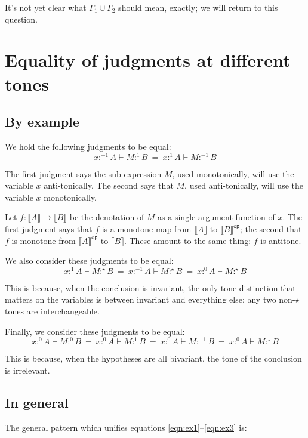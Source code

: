 \documentclass{article}
\newcommand{\todo}[1]{{\color{red}#1}}
\newcommand{\ms}[1]{\ensuremath{\mathsf{#1}}}
\newcommand{\GG}{\Gamma}
\newcommand{\op}{\ms{op}}
\newcommand{\den}[1]{\llbracket{#1}\rrbracket}
\newcommand{\tm}{\ensuremath{1}}     %
\newcommand{\ta}{\ensuremath{{-1}}}  %
\newcommand{\ti}{\ensuremath{\star}} %
\newcommand{\tb}{\ensuremath{0}}     %
\newcommand{\h}[3]{#1 :^{#3}\! {#2}}
\newcommand{\hm}[2]{\h{#1}{#2}{\tm}}
\newcommand{\ha}[2]{\h{#1}{#2}{\ta}}
\newcommand{\hi}[2]{\h{#1}{#2}{\ti}}
\newcommand{\hb}[2]{\h{#1}{#2}{\tb}}
\begin{document}
It's not yet clear what $\GG_1 \cup \GG_2$ should mean, exactly; \todo{we will
  return to this question.}


\section{Equality of judgments at different tones}

\subsection{By example}

We hold the following judgments to be equal:
\begin{equation}\label{eqn:ex1}
 \ha{x}{A} \vdash \hm{M}{B} ~=~ \hm{x}{A} \vdash \ha{M}{B}
\end{equation}

The first judgment says the sub-expression $M$, used monotonically, will use the
variable $x$ anti-tonically. The second says that $M$, used anti-tonically, will
use the variable $x$ monotonically.

Let $f : \den{A} \to \den{B}$ be the denotation of $M$ as a single-argument
function of $x$. The first judgment says that $f$ is a monotone map from
$\den{A}$ to $\den{B}^{\op}$; the second that $f$ is monotone from
$\den{A}^{\op}$ to $\den{B}$. These amount to the same thing: $f$ is
antitone.

We also consider these judgments to be equal:
\begin{equation}
  \hm{x}{A} \vdash \hi{M}{B}
  ~=~
  \ha{x}{A} \vdash \hi{M}{B}
  ~=~
  \hb{x}{A} \vdash \hi{M}{B}
\end{equation}

This is because, when the conclusion is invariant, the only tone distinction
that matters on the variables is between invariant and everything else; any two
non-$\ti$ tones are interchangeable.

Finally, we consider these judgments to be equal:
\begin{equation} \label{eqn:ex3}
  \hb{x}{A} \vdash \hb{M}{B}
  ~=~
  \hb{x}{A} \vdash \hm{M}{B}
  ~=~
  \hb{x}{A} \vdash \ha{M}{B}
  ~=~
  \hb{x}{A} \vdash \hi{M}{B}
\end{equation}

This is because, when the hypotheses are all bivariant, the tone of the
conclusion is irrelevant.


\subsection{In general}
The general pattern which unifies equations \ref{eqn:ex1}--\ref{eqn:ex3} is:
\end{document}
